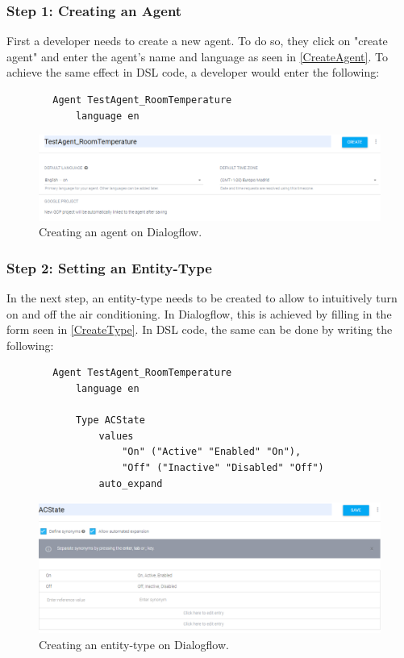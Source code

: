 \subsubsection{Step 1: Creating an Agent}
First a developer needs to create a new agent. To do so, they click on "create agent" and enter the agent's name and language as seen in \autoref{CreateAgent}.
To achieve the same effect in DSL code, a developer would enter the following:
\begin{samepage}
    \begin{verbatim}
        Agent TestAgent_RoomTemperature
            language en 
    \end{verbatim}
\end{samepage}

\begin{figure}[ht]
    \centering
    \includegraphics[width=1\textwidth]{Thesis_Images/CreateAgent.PNG}
    \caption{Creating an agent on Dialogflow.}
        \label{CreateAgent}
\end{figure}

\subsubsection{Step 2: Setting an Entity-Type}
In the next step, an entity-type needs to be created to allow to intuitively turn on and off the air conditioning.
In Dialogflow, this is achieved by filling in the form seen in \autoref{CreateType}.
In DSL code, the same can be done by writing the following:
\begin{samepage}    
    \begin{verbatim}
        Agent TestAgent_RoomTemperature
            language en 
        
            Type ACState
                values 
                    "On" ("Active" "Enabled" "On"),
                    "Off" ("Inactive" "Disabled" "Off")
                auto_expand
    \end{verbatim}
\end{samepage}

\begin{figure}[ht]
    \centering
    \includegraphics[width=1\textwidth]{Thesis_Images/CreateType.PNG}
    \caption{Creating an entity-type on Dialogflow.}
        \label{CreateType}
\end{figure}

